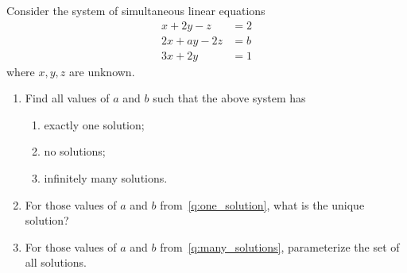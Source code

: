 
\item 

Consider the system of simultaneous linear equations
\begin{align*}
  x + 2y -  z &= 2 \\
 2x + ay - 2z &= b \\
 3x + 2y      &= 1
\end{align*}
where $x, y, z$ are unknown.

\begin{enumerate}
\item Find all values of $a$ and $b$ such that the above system has
\begin{enumerate}
\item \label{q:one_solution} exactly one solution;
\item no solutions;
\item \label{q:many_solutions} infinitely many solutions.
\end{enumerate}
\item For those values of $a$ and $b$ from~\ref{q:one_solution}, what is the
unique solution?
\item For those values of $a$ and $b$ from~\ref{q:many_solutions},
 parameterize the set of all solutions.
\end{enumerate}


